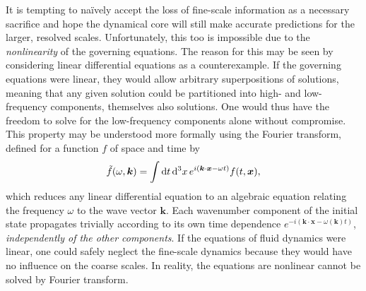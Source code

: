 \documentclass[titlepage,twoside]{article}
\numberwithin{equation}{section}
\renewcommand{\d}[1]{\mathrm{d}#1}
\renewcommand\vec{\bm}
\begin{document}
It is tempting to na\"{i}vely accept the loss of fine-scale information as a
necessary sacrifice and hope the dynamical core will still make accurate
predictions for the larger, resolved scales. Unfortunately, this too is
impossible due to the \emph{nonlinearity} of the governing equations.
The reason for this may be seen by considering linear differential equations
as a counterexample. If the governing equations were linear, they would allow
arbitrary superpositions of solutions,
meaning that any given solution could be partitioned into high- and low-frequency
components, themselves also solutions. One would thus have the freedom to solve
for the low-frequency components alone without compromise. This property may be
understood more formally using the Fourier transform, defined for a function
$f$ of space and time by
\[
    \tilde{f}(\omega, \vec{k})
        = \int \d{t}\,\d^3{x}\, e^{i(\vec{k} \cdot \vec{x} - \omega t)}
        f(t, \vec{x}),
\]
which reduces any linear differential equation to an algebraic equation
relating the frequency $\omega$ to the wave vector $\vec{k}$. Each wavenumber
component of the initial state propagates trivially according to its own
time dependence $e^{-i(\vec{k} \cdot \vec{x} - \omega(\vec{k}) t)}$,
\emph{independently of the other components}. If the equations of fluid
dynamics were linear, one could safely neglect the fine-scale dynamics because
they would have no influence on the coarse scales. In reality, the equations
are nonlinear cannot be solved by Fourier transform.
\end{document}
